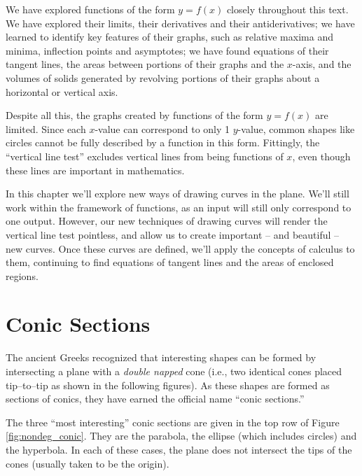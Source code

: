 We have explored functions of the form $y=f(x)$ closely throughout this text. We have explored their limits, their derivatives and their antiderivatives; we have learned to identify key features of their graphs, such as relative maxima and minima, inflection points and asymptotes; we have found equations of their tangent lines, the areas between portions of their graphs and the $x$-axis, and the volumes of solids generated by revolving portions of their graphs about a horizontal or vertical axis.

Despite all this, the graphs created by functions of the form $y=f(x)$ are limited. Since each $x$-value can correspond to only 1 $y$-value, common shapes like circles cannot be fully described by a function in this form.  Fittingly, the ``vertical line test''  excludes vertical lines from being functions of $x$, even though these lines are important in mathematics.

In this chapter we'll explore new ways of drawing curves in the plane. We'll still work within the framework of functions, as an input will still only correspond to one output. However, our new techniques of drawing curves will render the vertical line test pointless, and allow us to create important -- and beautiful -- new curves. Once these curves are defined, we'll apply the concepts of calculus to them, continuing to find equations of tangent lines and the areas of enclosed regions. 

\enlargethispage{15\baselineskip}

\section{Conic Sections}\label{sec:conic_sections}

The ancient Greeks recognized that interesting shapes can be formed by intersecting a plane with a 
\textit{double napped} cone (i.e., two identical cones placed tip--to--tip as shown in the following figures). As these shapes are formed as sections of conics, they have earned the official name ``conic sections.''

The three ``most interesting\primeskip'' conic sections are given in the top row of Figure \ref{fig:nondeg_conic}. They are the parabola, the ellipse (which includes circles) and the hyperbola. In each of these cases, the plane does not intersect the tips of the cones (usually taken to be the origin). \\


